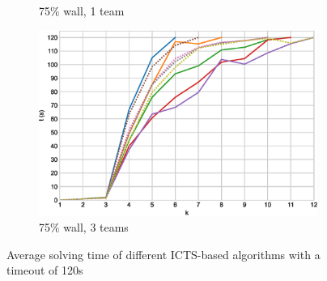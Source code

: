 \documentclass[english,10pt]{article}
\begin{document}
\begin{figure}[t]
\begin{subfigure}{0.44\textwidth}
			\caption{75\% wall, 1 team}
			\label{fig:i-75-1}
		\end{subfigure}
		\begin{subfigure}{0.44\textwidth}
			\centering
			\includegraphics[width=\linewidth]{img/results/icts-comparison/75-3}
			\caption{75\% wall, 3 teams}
			\label{fig:i-75-3}
		\end{subfigure}
		\caption{Average solving time of different ICTS-based algorithms with a timeout of 120s}
		\label{fig:i-times}
	\end{figure}
\end{document}
